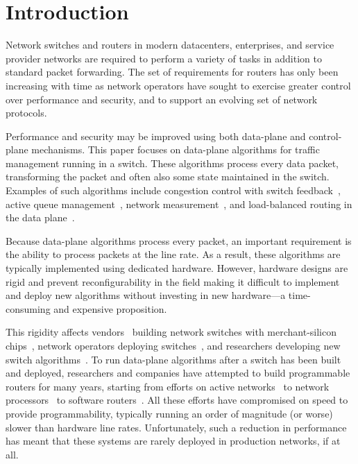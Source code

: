 \section{Introduction}
\label{s:intro}

Network switches and routers in modern datacenters, enterprises, and
service provider networks are required to perform a variety of tasks
in addition to standard packet forwarding. The set of requirements for
routers has only been increasing with time as network operators have
sought to exercise greater control over performance and security, and
to support an evolving set of network protocols.

Performance and security may be improved using both data-plane and
control-plane mechanisms. This paper focuses on data-plane algorithms
for traffic management running in a switch. These algorithms process
every data packet, transforming the packet and often also some state
maintained in the switch.  Examples of such algorithms include
congestion control with switch feedback~\cite{xcp, rcp, pdq, dctcp},
active queue management~\cite{Floyd93,BLUE,pi,AVQ,REM,codel,pie},
network measurement~\cite{opensketch, bitmap_george, elephant_george,
  heavyhitters}, and load-balanced routing in the data
plane~\cite{conga}.

Because data-plane algorithms process every packet, an important
requirement is the ability to process packets at the line rate.  As a
result, these algorithms are typically implemented using dedicated
hardware. However, hardware designs are rigid and prevent
reconfigurability in the field making it difficult to implement and
deploy new algorithms without investing in new hardware---a
time-consuming and expensive proposition.

This rigidity affects vendors~\cite{cisco_nexus, dell_force10,
  arista_7050} building network switches with merchant-silicon
chips~\cite{trident, tomahawk, mellanox}, network operators deploying
switches~\cite{google,facebook,vl2}, and researchers developing new
switch algorithms~\cite{xcp, codel, d3, detail, pdq}.
%
To run data-plane algorithms after a switch has been built and
deployed, researchers and companies have attempted to build
programmable routers for many years, starting from efforts on active
networks~\cite{active-nets} to network processors~\cite{npu_survey} to
software routers~\cite{click,routebricks}. All these efforts have
compromised on speed to provide programmability, typically running an
order of magnitude (or worse) slower than hardware line
rates. Unfortunately, such a reduction in performance has meant that
these systems are rarely deployed in production networks, if at all.

